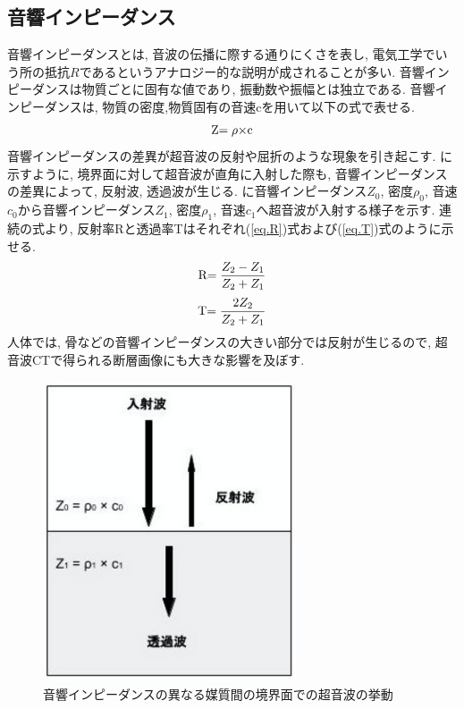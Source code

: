 \subsection{音響インピーダンス}
音響インピーダンスとは, 音波の伝播に際する通りにくさを表し, 電気工学でいう所の抵抗$R$であるというアナロジー的な説明が成されることが多い. 音響インピーダンスは物質ごとに固有な値であり, 振動数や振幅とは独立である. 音響インピーダンスは, 物質の密度,物質固有の音速cを用いて以下の式で表せる.
\begin{equation}
\label{eq.impeadance}
\\ $Z$ = \rho \times $c$
\end{equation}
音響インピーダンスの差異が超音波の反射や屈折のような現象を引き起こす.  に示すように, 境界面に対して超音波が直角に入射した際も, 音響インピーダンスの差異によって, 反射波, 透過波が生じる.  に音響インピーダンス$Z_0$, 密度$\rho_0$, 音速$c_0$から音響インピーダンス$Z_1$, 密度$\rho_1$, 音速$c_1$へ超音波が入射する様子を示す. 連続の式より, 反射率Rと透過率Tはそれぞれ(\ref{eq.R})式および(\ref{eq.T})式のように示せる.
\begin{equation}
\label{eq.R}
\\$R$= \dfrac{Z_2 - Z_1}{Z_2 + Z_1}
\end{equation}
\begin{equation}
\label{eq.T}
\\$T$= \dfrac{2Z_2}{Z_2 + Z_1}
\end{equation}
人体では, 骨などの音響インピーダンスの大きい部分では反射が生じるので, 超音波CTで得られる断層画像にも大きな影響を及ぼす. 
\begin{figure}[H]
  \begin{center}
    \includegraphics[width=75mm]{fig/impeadance.pdf}
  \end{center}
  \caption{音響インピーダンスの異なる媒質間の境界面での超音波の挙動}
\end{figure}
